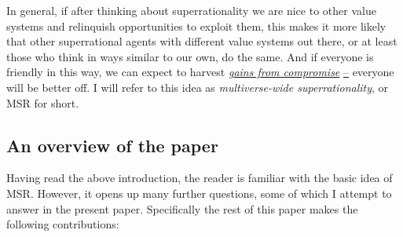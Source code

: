 In general, if after thinking about superrationality we are nice to
other value systems and relinquish opportunities to exploit them, this
makes it more likely that other superrational agents with different
value systems out there, or at least those who think in ways similar to
our own, do the same. And if everyone is friendly in this way, we can
expect to harvest
\href{https://foundational-research.org/gains-from-trade-through-compromise/}{\emph{gains
from compromise}}
\href{https://foundational-research.org/gains-from-trade-through-compromise/}{--}
everyone will be better off. I will refer to this idea as
\emph{multiverse-wide superrationality}, or MSR for short.

\hypertarget{an-overview-of-the-paper}{\subsection{An overview of the
paper}\label{an-overview-of-the-paper}}

Having read the above introduction, the reader is familiar with the
basic idea of MSR. However, it opens up many further questions, some of
which I attempt to answer in the present paper. Specifically the rest of
this paper makes the following contributions:


